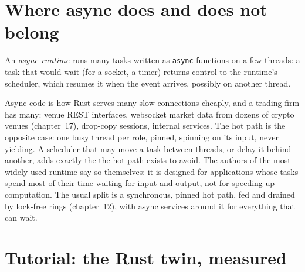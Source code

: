 \label{lst:ll:rust-for-low-latency:pin}

\section{Where async does and does not belong}

\begin{definition}\label{def:ll:rust-for-low-latency:async}
An \emph{async runtime} runs many tasks written as \texttt{async} functions on a few threads: a task
that would wait (for a socket, a timer) returns control to the runtime's scheduler, which resumes it when the event
arrives, possibly on another thread.
\end{definition}

Async code is how Rust serves many slow connections cheaply, and a trading firm has many: venue REST interfaces, websocket
market data from dozens of crypto venues (chapter~17), drop-copy sessions, internal services. The hot path is the opposite
case: one busy thread per role, pinned, spinning on its input, never yielding. A scheduler that may move a task between
threads, or delay it behind another, adds exactly the  the hot path exists to avoid. The authors of the most
widely used runtime say so themselves: it is designed for applications whose tasks spend most of their time waiting for
input and output, not for speeding up computation. The usual split is a synchronous, pinned hot path, fed and drained by
lock-free rings (chapter~12), with async services around it for everything that can wait.

\section{Tutorial: the Rust twin, measured}\label{tut:ll:rust-for-low-latency:tut}

